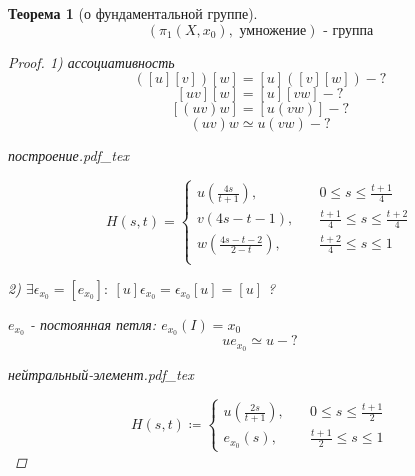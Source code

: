 \documentclass[a4paper]{article}
\newcommand{\incfig}[1]{%
\def\svgwidth{\columnwidth}
{#1.pdf_tex}
}
\newtheorem*{theorem}{Теорема}
\theoremstyle{definition}
\theoremstyle{remark}
\begin{document}
\begin{tcolorbox}[title=Теорема о фундаментальной группе,
    enhanced, 
    breakable,
    skin first=enhanced,
    skin middle=enhanced,
    skin last=enhanced,
    ]
    \begin{theorem}[о фундаментальной группе]
        \[
            (\pi_1(X, x_0), \text{ умножение}) \text{ - группа}
        \]

        \begin{proof}
            1) ассоциативность
            \[
                ([u][v])[w] = [u]([v][w]) - ?
            \]
            \[
                [uv][w] = [u][vw] - ?
            \]
            \[
                [(uv)w] = [u(vw)] - ?
            \]
            \[
                (uv)w \simeq u(vw) - ?
            \]
            \begin{center}
                \incfig{построение}
            \end{center}
            \[
                H(s,t) =
                \begin{cases}
                    u \left(\frac{4s}{t+1} \right), &\quad 0 \leq s \leq \frac{t+1}{4}\\
                    v \left(4s-t-1 \right), &\quad \frac{t+1}{4} \leq s \leq \frac{t+2}{4}\\
                    w \left(\frac{4s-t-2}{2-t} \right), &\quad 
                    \frac{t+2}{4} \leq s \leq 1\\
                \end{cases}
            \]

            2) $ \exists \epsilon_{x_0} = [e_{x_0}]: \ [u]\epsilon_{x_0}
            = \epsilon_{x_0}[u] = [u]$ ?

            $ e_{x_0} $ - постоянная петля: $ e_{x_0}(I) = x_0 $ 
            \[
                u e_{x_0} \simeq u - ?
            \]

            \begin{center}
                \incfig{нейтральный-элемент}
            \end{center}
            \[
                H(s,t) \coloneqq
                \begin{cases}
                    u \left(\frac{2s}{t+1} \right), &\quad 0 \leq s \leq \frac{t+1}{2}\\ 
                    e_{x_0}(s), &\quad \frac{t+1}{2} \leq s \leq 1
                \end{cases}
            \]
        \end{proof}
    \end{theorem}
\end{tcolorbox}
\end{document}
